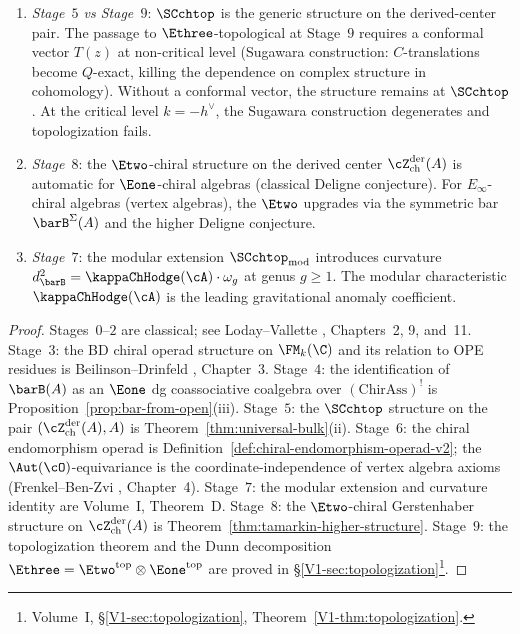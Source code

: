 \begin{proposition}
\begin{enumerate}[label=\textup{(\roman*)}]
\item \emph{Stage~$5$ vs Stage~$9$}: $\SCchtop$ is the generic
 structure on the derived-center pair. The passage to
 $\Ethree$-topological at Stage~$9$ requires a conformal vector
 $T(z)$ at non-critical level \textup{(}Sugawara construction:
 $C$-translations become $Q$-exact, killing the dependence on
 complex structure in cohomology\textup{)}.
 Without a conformal vector, the structure remains at $\SCchtop$.
 At the critical level $k = -h^\vee$, the Sugawara construction
 degenerates and topologization fails.

\item \emph{Stage~$8$}: the $\Etwo$-chiral structure on the derived
 center $\cZ^{\mathrm{der}}_{\mathrm{ch}}(A)$ is automatic for
 $\Eone$-chiral algebras \textup{(}classical Deligne
 conjecture\textup{)}. For $E_\infty$-chiral algebras
 \textup{(}vertex algebras\textup{)}, the $\Etwo$ upgrades
 via the symmetric bar $\barB^\Sigma(A)$ and the higher
 Deligne conjecture.

\item \emph{Stage~$7$}: the modular extension
 $\SCchtop_{\mathrm{mod}}$ introduces curvature
 $d_{\barB}^2 = \kappaChHodge(\cA) \cdot \omega_g$ at genus $g \ge 1$.
 The modular characteristic $\kappaChHodge(\cA)$ is the leading
 gravitational anomaly coefficient.
\end{enumerate}
\end{proposition}

\begin{proof}
Stages~$0$--$2$ are classical; see Loday--Vallette \cite{LV12},
Chapters~2, 9, and~11.
Stage~$3$: the BD chiral operad structure on $\FM_k(\C)$ and
its relation to OPE residues is Beilinson--Drinfeld
\cite{BD04}, Chapter~3.
Stage~$4$: the identification of $\barB(A)$ as an $\Eone$
dg coassociative coalgebra over $(\mathrm{ChirAss})^!$ is
Proposition~\ref{prop:bar-from-open}(iii).
Stage~$5$: the $\SCchtop$ structure on the pair
$(\cZ^{\mathrm{der}}_{\mathrm{ch}}(A), A)$ is
Theorem~\ref{thm:universal-bulk}(ii).
Stage~$6$: the chiral endomorphism operad is
Definition~\ref{def:chiral-endomorphism-operad-v2}; the
$\Aut(\cO)$-equivariance is the coordinate-independence of
vertex algebra axioms (Frenkel--Ben-Zvi \cite{FBZ04},
Chapter~4).
Stage~$7$: the modular extension and curvature identity are
Volume~I, Theorem~D.
Stage~$8$: the $\Etwo$-chiral Gerstenhaber structure on
$\cZ^{\mathrm{der}}_{\mathrm{ch}}(A)$ is
Theorem~\ref{thm:tamarkin-higher-structure}.
Stage~$9$: the topologization theorem and the Dunn decomposition
$\Ethree = \Etwo^{\mathrm{top}} \otimes \Eone^{\mathrm{top}}$ are
proved in
\S\ref*{V1-sec:topologization}\footnote{Volume~I,
\S\textup{\ref*{V1-sec:topologization}},
Theorem~\textup{\ref*{V1-thm:topologization}}.}.
\end{proof}
